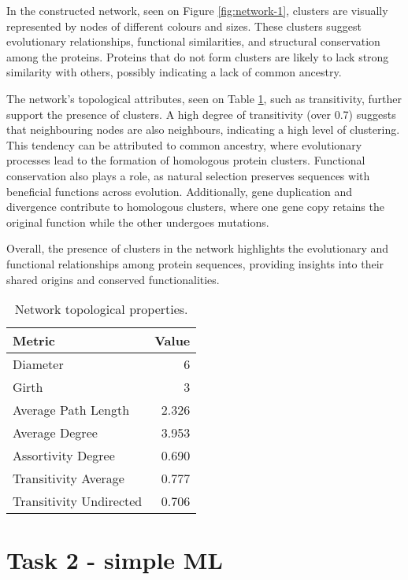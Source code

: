 \documentclass[a4paper,12pt]{article}
\begin{document}
In the constructed network, seen on Figure \ref{fig:network-1}, clusters are visually represented by nodes of different colours and sizes. These clusters suggest evolutionary relationships, functional similarities, and structural conservation among the proteins. Proteins that do not form clusters are likely to lack strong similarity with others, possibly indicating a lack of common ancestry.

The network's topological attributes, seen on Table \ref{tab:topological-network-1}, such as transitivity, further support the presence of clusters. A high degree of transitivity (over 0.7) suggests that neighbouring nodes are also neighbours, indicating a high level of clustering. This tendency can be attributed to common ancestry, where evolutionary processes lead to the formation of homologous protein clusters. Functional conservation also plays a role, as natural selection preserves sequences with beneficial functions across evolution. Additionally, gene duplication and divergence contribute to homologous clusters, where one gene copy retains the original function while the other undergoes mutations.

Overall, the presence of clusters in the network highlights the evolutionary and functional relationships among protein sequences, providing insights into their shared origins and conserved functionalities.

\begin{table}[h]
\centering 
\begin{tabular}{lr}
\toprule
Metric & Value \\
\midrule
    Diameter & 6 \\
    Girth & 3 \\
    Average Path Length & 2.326 \\
    Average Degree & 3.953 \\
    Assortivity Degree & 0.690 \\
    Transitivity Average & 0.777 \\
    Transitivity Undirected & 0.706 \\
\bottomrule
\end{tabular}
\caption{
    Network topological properties. 
}
\label{tab:topological-network-1}
\end{table}


\pagebreak
\section{Task 2 - simple ML}
\end{document}
